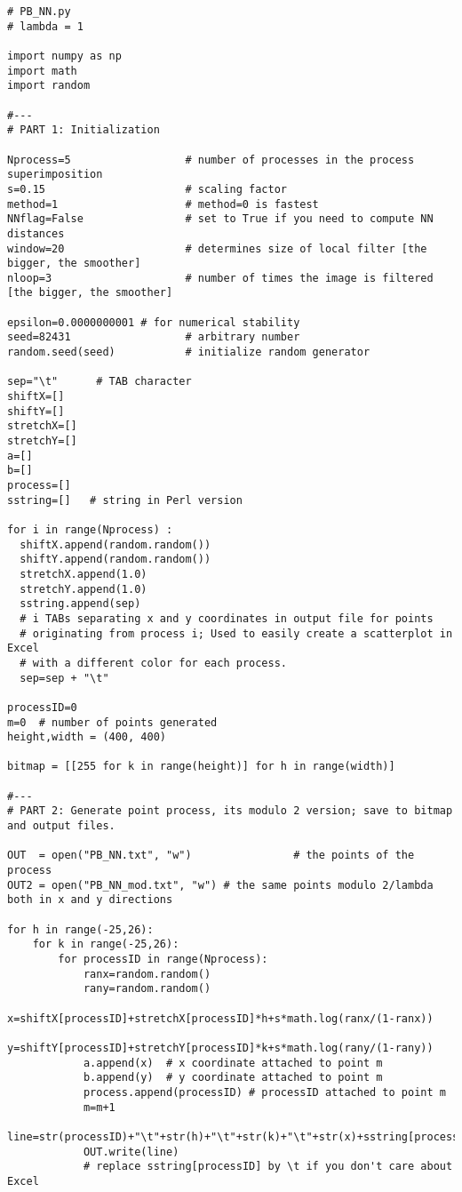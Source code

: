 \documentclass[oneside,10pt]{book}
\begin{document}
\begin{lstlisting}
# PB_NN.py  
# lambda = 1

import numpy as np
import math
import random

#---
# PART 1: Initialization

Nprocess=5                  # number of processes in the process superimposition
s=0.15                      # scaling factor
method=1                    # method=0 is fastest
NNflag=False                # set to True if you need to compute NN distances
window=20                   # determines size of local filter [the bigger, the smoother]
nloop=3                     # number of times the image is filtered [the bigger, the smoother]

epsilon=0.0000000001 # for numerical stability
seed=82431                  # arbitrary number
random.seed(seed)           # initialize random generator 

sep="\t"      # TAB character 
shiftX=[]
shiftY=[]
stretchX=[]
stretchY=[]
a=[]
b=[]
process=[]
sstring=[]   # string in Perl version

for i in range(Nprocess) :
  shiftX.append(random.random())
  shiftY.append(random.random())
  stretchX.append(1.0)
  stretchY.append(1.0)
  sstring.append(sep)   
  # i TABs separating x and y coordinates in output file for points
  # originating from process i; Used to easily create a scatterplot in Excel 
  # with a different color for each process.
  sep=sep + "\t"

processID=0
m=0  # number of points generated
height,width = (400, 400)

bitmap = [[255 for k in range(height)] for h in range(width)]

#---
# PART 2: Generate point process, its modulo 2 version; save to bitmap and output files.

OUT  = open("PB_NN.txt", "w")                # the points of the process 
OUT2 = open("PB_NN_mod.txt", "w") # the same points modulo 2/lambda both in x and y directions

for h in range(-25,26):   
    for k in range(-25,26):  
        for processID in range(Nprocess): 
            ranx=random.random()
            rany=random.random()
            x=shiftX[processID]+stretchX[processID]*h+s*math.log(ranx/(1-ranx)) 
            y=shiftY[processID]+stretchY[processID]*k+s*math.log(rany/(1-rany))
            a.append(x)  # x coordinate attached to point m
            b.append(y)  # y coordinate attached to point m
            process.append(processID) # processID attached to point m
            m=m+1
            line=str(processID)+"\t"+str(h)+"\t"+str(k)+"\t"+str(x)+sstring[processID]+str(y)+"\n"
            OUT.write(line)
            # replace sstring[processID] by \t if you don't care about Excel


\end{lstlisting}
\end{document}
